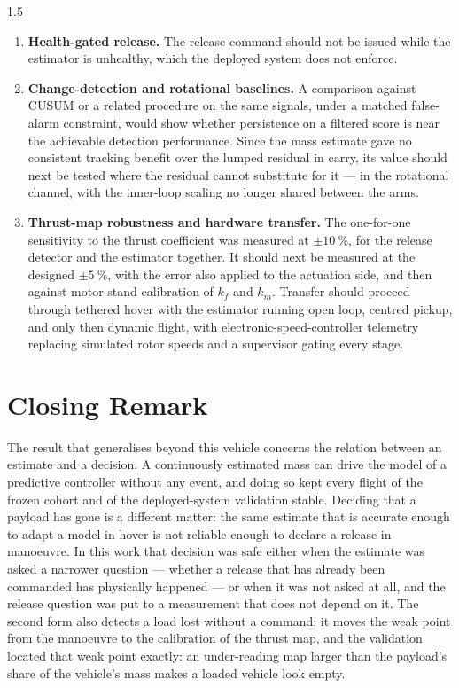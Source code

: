 \begin{spacing}{1.5}
\begin{enumerate}
\item \textbf{Health-gated release.} The release command should not be
issued while the estimator is unhealthy, which the deployed system does not
enforce.

\item \textbf{Change-detection and rotational baselines.} A comparison against
CUSUM or a related procedure on the same signals, under a matched false-alarm
constraint, would show whether persistence on a filtered score is near the
achievable detection performance. Since the mass estimate gave no consistent
tracking benefit over the lumped residual in carry, its value should next be
tested where the residual cannot substitute for it --- in the rotational
channel, with the inner-loop scaling no longer shared between the arms.

\item \textbf{Thrust-map robustness and hardware transfer.} The one-for-one
sensitivity to the thrust coefficient was measured at $\pm\SI{10}{\percent}$,
for the release detector and the estimator together. It should next be measured
at the designed $\pm\SI{5}{\percent}$, with the error also applied to the
actuation side, and then against motor-stand calibration of $k_f$ and $k_m$. Transfer should proceed through
tethered hover with the estimator running open loop, centred pickup, and only
then dynamic flight, with electronic-speed-controller telemetry replacing
simulated rotor speeds and a supervisor gating every stage.
\end{enumerate}

\section{Closing Remark}

The result that generalises beyond this vehicle concerns the relation between an
estimate and a decision. A continuously estimated mass can drive the model of a
predictive controller without any event, and doing so kept every flight of the
frozen cohort and of the deployed-system validation stable. Deciding that a payload has gone is a different matter: the
same estimate that is accurate enough to adapt a model in hover is not reliable
enough to declare a release in manoeuvre. In this work that decision was safe
either when the estimate was asked a narrower question --- whether a release that
has already been commanded has physically happened --- or when it was not asked
at all, and the release question was put to a measurement that does not depend
on it. The second form also detects a load lost without a command; it moves the
weak point from the manoeuvre to the calibration of the thrust map, and the
validation located that weak point exactly: an under-reading map larger than the
payload's share of the vehicle's mass makes a loaded vehicle look empty.

\end{spacing}
\newpage
